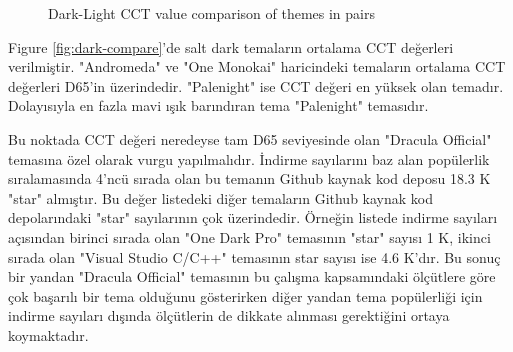 \documentclass{article}
\begin{document}
\dualtable
\pgfplotstabletranspose[colnames from=themes]\tabledual{\dualtable}

\begin{figure}[h]
  \caption{Dark-Light CCT value comparison of themes in pairs}
  \label{fig:dark-light-pair-compare}
\end{figure}

Figure \ref{fig:dark-compare}'de salt dark temaların ortalama CCT değerleri verilmiştir. "Andromeda" ve "One Monokai"
haricindeki temaların ortalama CCT değerleri D65'in üzerindedir. "Palenight" ise CCT değeri en yüksek olan temadır.
Dolayısıyla en fazla mavi ışık barındıran tema "Palenight" temasıdır.

Bu noktada CCT değeri neredeyse tam D65 seviyesinde olan "Dracula Official" temasına özel olarak vurgu yapılmalıdır.
İndirme sayılarını baz alan popülerlik sıralamasında 4'ncü sırada olan bu temanın Github kaynak kod deposu 18.3 K "star"
almıştır\cite{draculatheme2022github}.  Bu değer listedeki diğer temaların Github kaynak kod depolarındaki "star"
sayılarının çok üzerindedir.  Örneğin listede indirme sayıları açısından birinci sırada olan "One Dark Pro" temasının
"star" sayısı 1 K\cite{onedarkprotheme2022github}, ikinci sırada olan "Visual Studio C/C++" temasının star sayısı ise
4.6 K'dır\cite{visualstudiotheme2022github}.  Bu sonuç bir yandan "Dracula Official" temasının bu çalışma kapsamındaki
ölçütlere göre çok başarılı bir tema olduğunu gösterirken diğer yandan tema popülerliği için indirme sayıları dışında
ölçütlerin de dikkate alınması gerektiğini ortaya koymaktadır.

\darktable
\pgfplotstabletranspose[colnames from=themes]\tabledark{\darktable}
\end{document}
